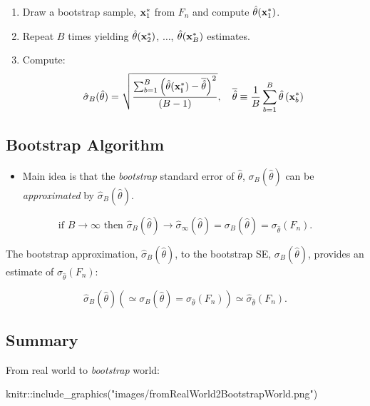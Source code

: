 \documentclass[
  letterpaper,
  DIV=11,
  numbers=noendperiod]{scrartcl}
\newenvironment{Shaded}{\begin{snugshade}}{\end{snugshade}}
\newcommand{\FunctionTok}[1]{\textcolor[rgb]{0.28,0.35,0.67}{#1}}
\newcommand{\NormalTok}[1]{\textcolor[rgb]{0.00,0.23,0.31}{#1}}
\newcommand{\SpecialCharTok}[1]{\textcolor[rgb]{0.37,0.37,0.37}{#1}}
\newcommand{\StringTok}[1]{\textcolor[rgb]{0.13,0.47,0.30}{#1}}
\providecommand{\tightlist}{%
  \setlength{\itemsep}{0pt}\setlength{\parskip}{0pt}}\usepackage{longtable,booktabs,array}
\begin{document}
\begin{enumerate}
\def\labelenumi{\arabic{enumi}.}
\tightlist
\item
  Draw a bootstrap sample, \({\bf x}_1^{*}\) from \(F_n\) and compute
  \(\hat{\theta}({\bf x}_1^{*})\).
\item
  Repeat \(B\) times yielding \(\hat{\theta}({\bf x}_2^{*})\),
  \(\dots\), \(\hat{\theta}({\bf x}_B^{*})\) estimates.
\item
  Compute: \begin{equation*}
  \hat{\sigma}_B (\hat\theta)= \sqrt{
   \frac{
       \sum_{b=1}^B\left( \hat{\theta}(%
       {\bf x^{*}_i})-\overline{\hat{\theta}}\right) ^2
       }{
       (B-1)   
       }
   }, \quad \overline{\hat{\theta}}\equiv \frac 1B\sum_{b=1}^B\hat{\theta}\left( {\bf x}%
  _b^{*}\right)
  \end{equation*}
\end{enumerate}

\hypertarget{bootstrap-algorithm}{%
\subsection{Bootstrap Algorithm}\label{bootstrap-algorithm}}

\begin{itemize}
\tightlist
\item
  Main idea is that the \emph{bootstrap} standard error of
  \(\hat\theta\), \(\sigma_B(\hat\theta)\) can be \emph{approximated} by
  \(\hat{\sigma}_B (\hat\theta)\).
\end{itemize}

\[
\mbox{if }B\rightarrow\infty \mbox{ then } \hat{\sigma}_B (\hat\theta) \rightarrow \hat\sigma_{\infty} (\hat\theta) =\sigma_B(\hat\theta)=\sigma_{\hat\theta}(F_n).
\]

The bootstrap approximation, \(\hat{\sigma}_B(\hat\theta)\), to the
bootstrap SE, \(\sigma_B(\hat\theta)\), provides an estimate of
\(\sigma_{\hat\theta}(F_n)\):

\[
\hat{\sigma}_B(\hat\theta)(\simeq \sigma_B(\hat\theta)=\sigma_{\hat\theta}(F_n))\simeq\hat \sigma_{\hat\theta}(F_n).
\]

\hypertarget{summary}{%
\subsection{Summary}\label{summary}}

From real world to \emph{bootstrap} world:

\begin{Shaded}
\begin{Highlighting}[]
\NormalTok{knitr}\SpecialCharTok{::}\FunctionTok{include\_graphics}\NormalTok{(}\StringTok{"images/fromRealWorld2BootstrapWorld.png"}\NormalTok{)}
\end{Highlighting}
\end{Shaded}
\end{document}
